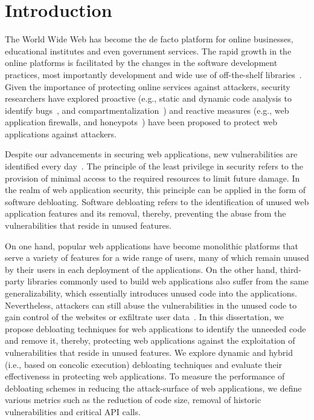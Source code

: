 \chapter{Introduction}

The World Wide Web has become the de facto platform for online businesses, educational institutes and even government services. 
The rapid growth in the online platforms is facilitated by the changes in the software development practices, most importantly development and wide use of off-the-shelf libraries~\cite{packagiststats, npmstatistics, pypi}. 
Given the importance of protecting online services against attackers, security researchers have explored proactive (e.g., static and dynamic code analysis to identify bugs~\cite{jovanovic2006pixy, dahse2010rips, alhuzali2018navex}, and 
compartmentalization~\cite{vasilakis2018breakapp}) and reactive measures (e.g., web application firewalls, and honeypots~\cite{makiou2014improving, barron2021click}) have been proposed to protect web applications against attackers. 

Despite our advancements in securing web applications, new vulnerabilities are identified every day~\cite{cvedetails}. 
The principle of the least privilege in security refers to the provision of minimal access to the required resources to limit future damage. 
In the realm of web application security, this principle can be applied in the form of software debloating. 
Software debloating refers to the identification of unused web application features and its removal, thereby, preventing the abuse from the vulnerabilities that reside in unused features. 

On one hand, popular web applications have become monolithic platforms that serve a variety of features for a wide range of users, many of which remain unused by their users in each deployment of the applications. 
On the other hand, third-party libraries commonly used to build web applications also suffer from the same generalizability, which essentially introduces unused code into the applications. 
Nevertheless, attackers can still abuse the vulnerabilities in the unused code to gain control of the websites or exfiltrate user data~\cite{drupalVulenrability, zendVulnerability, phpunitVulnerability, PHPGGC}. 
In this dissertation, we propose debloating techniques for web applications to identify the unneeded code and remove it, thereby, protecting web applications against the exploitation of vulnerabilities that reside in unused features. 
We explore dynamic and hybrid (i.e., based on concolic execution) debloating techniques and evaluate their effectiveness in protecting web applications. 
To measure the performance of debloating schemes in reducing the attack-surface of web applications, we define various metrics such as the reduction of code size, removal of historic vulnerabilities and critical API calls. 



